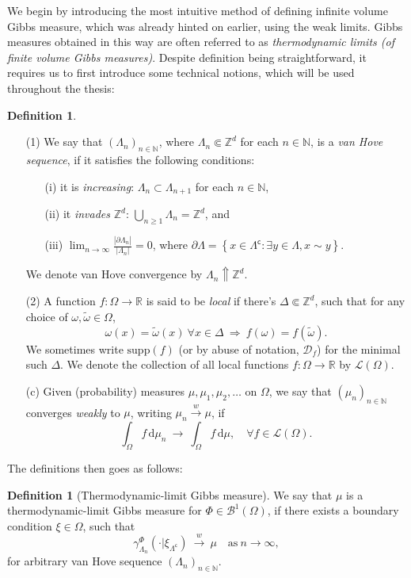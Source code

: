 \documentclass[12pt]{article}
\newcommand{\BB}{\mathscr{B}}
\newcommand{\D}{\mathcal{D}}
\renewcommand{\d}{\mathrm{d}}
\newcommand{\Loc}{\mathcal{L}}
\newcommand{\N}{\mathbb{N}}
\newcommand{\R}{\mathbb{R}}
\newcommand{\Z}{\mathbb{Z}}
\newcommand{\set}[1]{\left\{#1\right\}}
\newcommand{\ra}{\rightarrow}
\newcommand{\pika}{\boldsymbol{\cdot}}
\newcommand{\1}{\mathbbm{1}}
\renewcommand{\c}{\mathsf{c}}
\newcommand{\supp}{\mathrm{supp}}
\newcommand{\5}{\vspace{0.5cm}}
\renewcommand{\tilde}{\widetilde}
\theoremstyle{definition}
\newtheorem{df}[thm]{Definition}
\begin{document}
We begin by introducing the most intuitive method of defining infinite volume Gibbs measure, which was already hinted on earlier, using the weak limits. Gibbs measures obtained in this way are often referred to as \textit{thermodynamic limits (of finite volume Gibbs measures)}. Despite definition being straightforward, it requires us to first introduce some technical notions, which will be used throughout the thesis:

\begin{df}
~
\begin{itemize}
	\item[(1)] We say that $(\Lambda_n)_{n\in\N}$, where $\Lambda_n\Subset\Z^d$ for each $n\in\N$, is a \textit{van Hove sequence}, if it satisfies the following conditions:
	\begin{itemize}
		\item[(i)] it is \textit{increasing}: $\Lambda_n\subset\Lambda_{n+1}$ for each $n\in\N$,
		\item[(ii)] it \textit{invades} $\Z^d$: $\bigcup_{n\geq 1}\Lambda_n=\Z^d$, and
		\item[(iii)] $\lim_{n\ra\infty}\frac{|\partial\Lambda_n|}{|\Lambda_n|}=0$, where $\partial \Lambda=\set{x\in\Lambda^\c:\exists y\in\Lambda,x\sim y}$.
	\end{itemize}
	We denote van Hove convergence by $\Lambda_n\Uparrow\Z^d$.
	\item[(2)] A function $f:\Omega\ra\R$ is said to be \textit{local} if there's $\Delta\Subset\Z^d$, such that for any choice of $\omega,\tilde{\omega}\in\Omega$, 
	$$\omega(x)=\tilde{\omega}(x)~\forall x\in\Delta ~\Longrightarrow~ f(\omega)=f(\tilde{\omega}).$$
	We sometimes write $\supp(f)$ (or by abuse of notation, $\D_f$) for the minimal such $\Delta$. We denote the collection of all local functions $f:\Omega\ra\R$ by $\Loc(\Omega)$.
	\item[(c)] Given (probability) measures $\mu,\mu_1,\mu_2,\ldots$ on $\Omega$, we say that $(\mu_n)_{n\in\N}$ converges \textit{weakly} to $\mu$, writing $\mu_n\xrightarrow{w}\mu$, if
	$$\int_\Omega f\,\d\mu_n ~\ra~ \int_\Omega f\,\d\mu, \quad \forall f\in\Loc(\Omega).$$
\end{itemize}
\end{df}

The definitions then goes as follows:

\begin{df}[Thermodynamic-limit Gibbs measure]
We say that $\mu$ is a thermodynamic-limit Gibbs measure for $\Phi\in\BB^1(\Omega)$, if there exists a boundary condition $\xi\in\Omega$, such that
$$\gamma_{\Lambda_n}^\Phi(\pika|\xi_{\Lambda^\c}) ~\xrightarrow{w}~ \mu \quad \text{as}~n\ra\infty,$$
for arbitrary van Hove sequence $(\Lambda_n)_{n\in\N}$.
\end{df}
\end{document}
